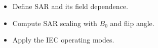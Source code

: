 \begin{objectives}
\begin{itemize}[leftmargin=1.4em,itemsep=2pt]
\item Define SAR and its field dependence.
\item Compute SAR scaling with $B_0$ and flip angle.
\item Apply the IEC operating modes.
\end{itemize}
\end{objectives}
